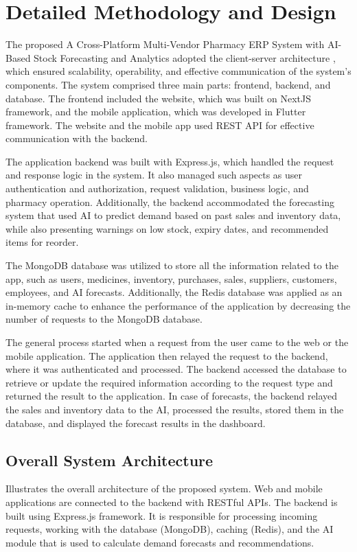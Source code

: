 \section{Detailed Methodology and Design}
The proposed A Cross-Platform Multi-Vendor Pharmacy ERP System with AI-Based Stock Forecasting and Analytics adopted the client-server architecture \cite{xu2020system}, which ensured scalability, operability, and effective communication of the system’s components. The system comprised three main parts: frontend, backend, and database. The frontend included the website, which was built on NextJS framework, and the mobile application, which was developed in Flutter framework. The website and the mobile app used REST API for effective communication with the backend.

The application backend was built with Express.js, which handled the request and response logic in the system. It also managed such aspects as user authentication and authorization, request validation, business logic, and pharmacy operation. Additionally, the backend accommodated the forecasting system that used AI to predict demand based on past sales and inventory data, while also presenting warnings on low stock, expiry dates, and recommended items for reorder.

The MongoDB database was utilized to store all the information related to the app, such as users, medicines, inventory, purchases, sales, suppliers, customers, employees, and AI forecasts. Additionally, the Redis database was applied as an in-memory cache to enhance the performance of the application by decreasing the number of requests to the MongoDB database.

The general process started when a request from the user came to the web or the mobile application. The application then relayed the request to the backend, where it was authenticated and processed. The backend accessed the database to retrieve or update the required information according to the request type and returned the result to the application. In case of forecasts, the backend relayed the sales and inventory data to the AI, processed the results, stored them in the database, and displayed the forecast results in the dashboard.
\subsection*{Overall System Architecture}
Illustrates the overall architecture of the proposed system. Web and mobile applications are connected to the backend with RESTful APIs. The backend is built using Express.js framework. It is responsible for processing incoming requests, working with the database (MongoDB), caching (Redis), and the AI module that is used to calculate demand forecasts and recommendations.


